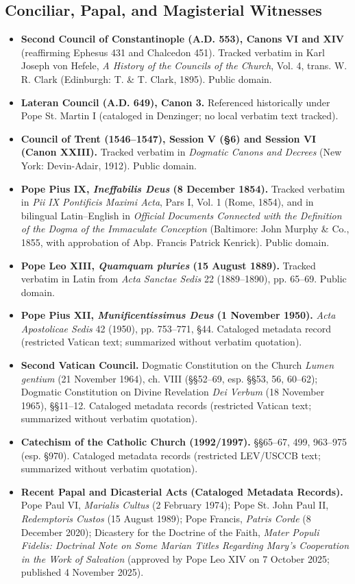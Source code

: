 \subsection{Conciliar, Papal, and Magisterial Witnesses}

\begin{itemize}
  \item \textbf{Second Council of Constantinople (A.D. 553), Canons VI and XIV} (reaffirming Ephesus 431 and Chalcedon 451). Tracked verbatim in Karl Joseph von Hefele, \textit{A History of the Councils of the Church}, Vol. 4, trans. W. R. Clark (Edinburgh: T. \& T. Clark, 1895). Public domain.
  \item \textbf{Lateran Council (A.D. 649), Canon 3.} Referenced historically under Pope St. Martin I (cataloged in Denzinger; no local verbatim text tracked).
  \item \textbf{Council of Trent (1546--1547), Session V (\S 6) and Session VI (Canon XXIII).} Tracked verbatim in \textit{Dogmatic Canons and Decrees} (New York: Devin-Adair, 1912). Public domain.
  \item \textbf{Pope Pius IX, \textit{Ineffabilis Deus} (8 December 1854).} Tracked verbatim in \textit{Pii IX Pontificis Maximi Acta}, Pars I, Vol. 1 (Rome, 1854), and in bilingual Latin--English in \textit{Official Documents Connected with the Definition of the Dogma of the Immaculate Conception} (Baltimore: John Murphy \& Co., 1855, with approbation of Abp. Francis Patrick Kenrick). Public domain.
  \item \textbf{Pope Leo XIII, \textit{Quamquam pluries} (15 August 1889).} Tracked verbatim in Latin from \textit{Acta Sanctae Sedis} 22 (1889--1890), pp. 65--69. Public domain.
  \item \textbf{Pope Pius XII, \textit{Munificentissimus Deus} (1 November 1950).} \textit{Acta Apostolicae Sedis} 42 (1950), pp. 753--771, \S 44. Cataloged metadata record (restricted Vatican text; summarized without verbatim quotation).
  \item \textbf{Second Vatican Council.} Dogmatic Constitution on the Church \textit{Lumen gentium} (21 November 1964), ch. VIII (\S\S 52--69, esp. \S\S 53, 56, 60--62); Dogmatic Constitution on Divine Revelation \textit{Dei Verbum} (18 November 1965), \S\S 11--12. Cataloged metadata records (restricted Vatican text; summarized without verbatim quotation).
  \item \textbf{Catechism of the Catholic Church (1992/1997).} \S\S 65--67, 499, 963--975 (esp. \S 970). Cataloged metadata records (restricted LEV/USCCB text; summarized without verbatim quotation).
  \item \textbf{Recent Papal and Dicasterial Acts (Cataloged Metadata Records).} Pope Paul VI, \textit{Marialis Cultus} (2 February 1974); Pope St. John Paul II, \textit{Redemptoris Custos} (15 August 1989); Pope Francis, \textit{Patris Corde} (8 December 2020); Dicastery for the Doctrine of the Faith, \textit{Mater Populi Fidelis: Doctrinal Note on Some Marian Titles Regarding Mary's Cooperation in the Work of Salvation} (approved by Pope Leo XIV on 7 October 2025; published 4 November 2025).
\end{itemize}

